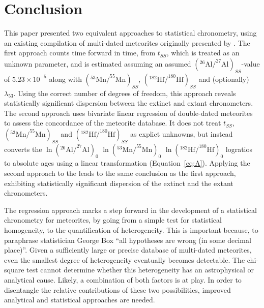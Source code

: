 \documentclass{article}
\begin{document}
\section{Conclusion}
\label{sec:conclusion}

This paper presented two equivalent approaches to statistical
chronometry, using an existing compilation of multi-dated meteorites
originally presented by \citet{desch2023a}. The first approach counts
time forward in time, from $t_{\mathit{SS}}$, which is treated as an
unknown parameter, and is estimated assuming an assumed
$\left(^{26}\mbox{Al}/^{27}\mbox{Al}\right)_{\mathit{SS}}$-value of
$5.23\times{10}^{-5}$ along with
$\left(^{53}\mbox{Mn}/^{55}\mbox{Mn}\right)_{\mathit{SS}}$,
$\left(^{182}\mbox{Hf}/^{180}\mbox{Hf}\right)_{\mathit{SS}}$ and
(optionally) $\lambda_{53}$. Using the correct number of degrees of
freedom, this approach reveals statistically significant dispersion
between the extinct and extant chronometers. The second approach uses
bivariate linear regression of double-dated meteorites to assess the
concordance of the meteorite database. It does not treat
$t_{\mathit{SS}}$,
$\left(^{53}\mbox{Mn}/^{55}\mbox{Mn}\right)_{\mathit{SS}}$ and
$\left(^{182}\mbox{Hf}/^{180}\mbox{Hf}\right)_{\mathit{SS}}$ as
explict unknowns, but instead converts the
$\ln\left(^{26}\mbox{Al}/^{27}\mbox{Al}\right)_0$
$\ln\left(^{53}\mbox{Mn}/^{55}\mbox{Mn}\right)_0$
$\ln\left(^{182}\mbox{Hf}/^{180}\mbox{Hf}\right)_0$ logratios to
absolute ages using a linear transformation
(Equation~\ref{eq:A}). Applying the second approach to the
\citet{desch2023a} leads to the same conclusion as the first approach,
exhibiting statistically significant dispersion of the extinct and the
extant chronometers.\medskip

The regression approach marks a step forward in the development of a
statistical chronometry for meteorites, by going from a simple test
for statistical homogeneity, to the quantification of heterogeneity.
This is important because, to paraphrase statistician George Box ``all
hypotheses are wrong (in some decimal place)''. Given a sufficiently
large or precise database of multi-dated meteorites, even the smallest
degree of heterogeneity eventually becomes detectable. The chi-square
test cannot determine whether this heterogeneity has an astrophysical
or analytical cause. Likely, a combination of both factors is at
play. In order to disentangle the relative contributions of these two
possibilities, improved analytical and statistical approaches are
needed.\medskip
\end{document}
